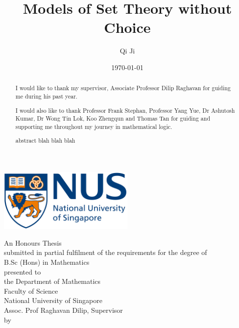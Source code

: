 \documentclass[british,a4paper,12pt,abstract=on]{scrreprt}
\title{Models of Set Theory without Choice}
\author{Qi Ji}
\date{\today}
\makeatletter
\let\thetitle\@title
\let\theauthor\@author
\let\thedate\@date
\theoremstyle{definition}
\theoremstyle{remark}
\newcommand{\makecoverpage}{
    \begin{center}
        \singlespacing
        \includegraphics[width=0.5\textwidth]{nus_logo}
        \vspace*{3em}

        \doublespacing
        {\huge \textbf{\thetitle}}
        \vspace*{5em}

        {An Honours Thesis \\ submitted in partial fulfilment of the requirements for
        the degree of \\ B.Sc (Hons) in Mathematics\\}
        \vspace*{3em}
        {presented to \\ the Department of Mathematics \\ Faculty of Science \\ National University of Singapore \\ Assoc. Prof Raghavan Dilip, Supervisor \\}
        \vspace*{3em}
        {by \\ \theauthor \\}
        \vspace*{3em}
        {\thedate}
    \end{center}
}
\newenvironment*{acknowledgements}{\renewcommand\abstractname{Acknowledgements}\begin{abstract}} {\end{abstract}}
\makeatother
\begin{document}
\let\setminus\smallsetminus
\let\epsilon\varepsilon
\begin{titlepage}
    \makecoverpage
\end{titlepage}
{}
\begin{acknowledgements}
    I would like to thank my supervisor, Associate Professor Dilip Raghavan for guiding me during his past year.

    I would also like to thank Professor Frank Stephan, Professor Yang Yue, Dr Ashutosh Kumar, Dr Wong Tin Lok, Koo Zhengqun and Thomas Tan for guiding and supporting me throughout my journey in mathematical logic.
\end{acknowledgements}

{}
\begin{abstract}
    abstract blah blah blah


\end{abstract}

\tableofcontents






\printbibliography[heading=bibintoc,title={References}]
\end{document}
